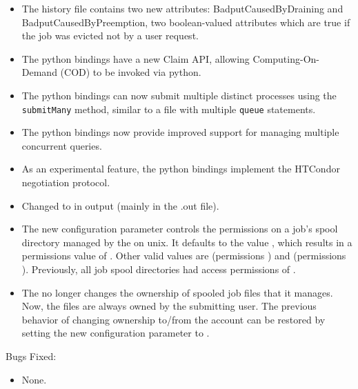 \begin{itemize}

\item The  history file contains two new attributes: BadputCausedByDraining and BadputCausedByPreemption, two boolean-valued attributes which are true if the job was evicted not by a user request.

\item The python bindings have a new Claim API, allowing Computing-On-Demand (COD) to be
invoked via python.

\item The python bindings can now submit multiple distinct processes using the \texttt{submitMany}
method, similar to a  file with multiple \texttt{queue} statements.

\item The python bindings now provide improved support for managing multiple concurrent queries.

\item As an experimental feature, the python bindings implement the HTCondor negotiation protocol.

\item Changed  to  in 
output (mainly in the .out file).

\item The new configuration parameter 
controls the permissions on a job's spool directory managed by the
 on unix.
It defaults to the value , which results in a permissions
value of .
Other valid values are  (permissions ) and
 (permissions ).
Previously, all job spool directories had access permissions of .

\item The  no longer changes the ownership of spooled job
files that it manages.
Now, the files are always owned by the submitting user.
The previous behavior of changing ownership to/from the 
account can be restored by setting the new configuration parameter
 to .

\end{itemize}

\noindent Bugs Fixed:

\begin{itemize}

\item None.

\end{itemize}
